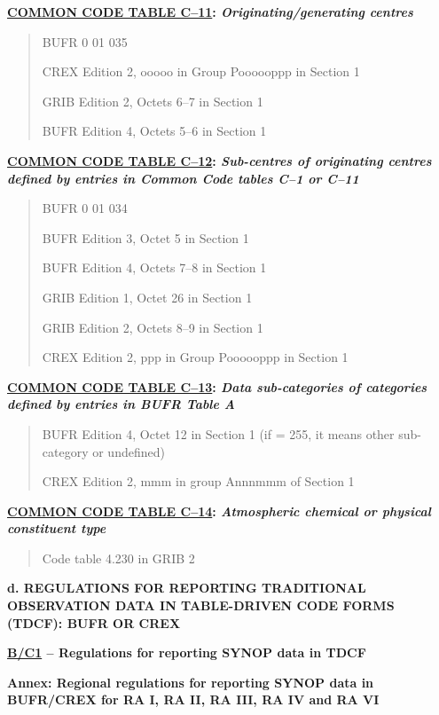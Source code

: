 \textbf{\href{WMO306_vI2_CommonTable_en.pdf}{COMMON CODE TABLE C--11}: \emph{Originating/generating centres}}

\begin{quote}
BUFR 0 01 035

CREX Edition 2, ooooo in Group Poooooppp in Section 1

GRIB Edition 2, Octets 6--7 in Section 1

BUFR Edition 4, Octets 5--6 in Section 1
\end{quote}

\textbf{\href{WMO306_vI2_CommonTable_en.pdf}{COMMON CODE TABLE C--12}: \emph{Sub-centres of originating centres defined by entries in Common Code tables C--1 or C--11}}

\begin{quote}
BUFR 0 01 034

BUFR Edition 3, Octet 5 in Section 1

BUFR Edition 4, Octets 7--8 in Section 1

GRIB Edition 1, Octet 26 in Section 1

GRIB Edition 2, Octets 8--9 in Section 1

CREX Edition 2, ppp in Group Poooooppp in Section 1
\end{quote}

\textbf{\href{WMO306_vI2_CommonTable_en.pdf}{COMMON CODE TABLE C--13}: \emph{Data sub-categories of categories defined by entries in BUFR Table A}}

\begin{quote}
BUFR Edition 4, Octet 12 in Section 1 (if = 255, it means other sub-category or undefined)

CREX Edition 2, mmm in group Annnmmm of Section 1
\end{quote}

\textbf{\href{WMO306_vI2_CommonTable_en.pdf}{COMMON CODE TABLE C--14}: \emph{Atmospheric chemical or physical constituent type}}

\begin{quote}
Code table 4.230 in GRIB 2
\end{quote}

\textbf{d. REGULATIONS FOR REPORTING TRADITIONAL OBSERVATION DATA IN TABLE-DRIVEN CODE FORMS (TDCF): BUFR OR CREX}

\textbf{\href{WMO306_vI2_BUFRCREX_BC1_en.pdf}{B/C1} -- Regulations for reporting SYNOP data in TDCF}

\textbf{Annex: Regional regulations for reporting SYNOP data in BUFR/CREX for RA I, RA II, RA III, RA IV and RA VI}

